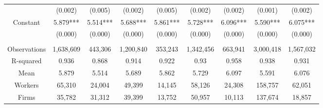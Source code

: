 \begin{tabular}{c|cccccccc}
      & (0.002) & (0.005) & (0.002) & (0.005) & (0.002) & (0.002) & (0.001) & (0.002) \\
Constant & 5.879*** & 5.514*** & 5.688*** & 5.861*** & 5.728*** & 6.096*** & 5.590*** & 6.075*** \\
      & (0.000) & (0.000) & (0.000) & (0.000) & (0.000) & (0.000) & (0.000) & (0.000) \\
      &       &       &       &       &       &       &       &  \\
\midrule
Observations & 1,638,609 & 443,306 & 1,200,840 & 353,243 & 1,342,456 & 663,941 & 3,000,418 & 1,567,032 \\
R-squared & 0.936 & 0.868 & 0.914 & 0.922 & 0.93  & 0.958 & 0.938 & 0.931 \\
Mean  & 5.879 & 5.514 & 5.689 & 5.862 & 5.729 & 6.097 & 5.591 & 6.076 \\
Workers & 65,310 & 24,004 & 49,399 & 14,145 & 58,126 & 24,308 & 158,757 & 62,051 \\
Firms & 35,782 & 31,312 & 39,399 & 13,752 & 50,957 & 10,113 & 137,674 & 18,857 \\
\bottomrule
\bottomrule
\end{tabular}%
